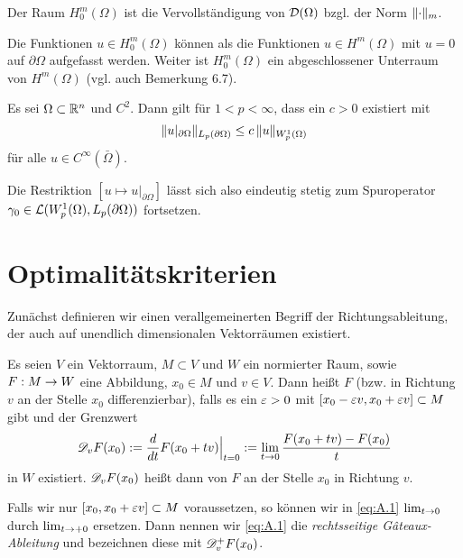 \begin{defi}\label{def:A.7}
Der Raum $H^m_0(\Omega)$ ist die Vervollständigung von $\mathcal D(\Omega)$ bzgl. der Norm $\lVert \cdot\rVert_m$.
\end{defi}

\begin{bem}\label{bem:A.8}
Die Funktionen $u \in H^m_0(\Omega)$ können als die Funktionen $u \in H^m(\Omega)$ mit $u = 0$ auf $\partial \Omega$ aufgefasst werden. Weiter ist $H^m_0(\Omega)$ ein abgeschlossener Unterraum von $H^m(\Omega)$ (vgl. auch \cite{Walker} Bemerkung 6.7).
\end{bem}


\begin{theorem}
  \label{theorem:A.9}
  Es sei $\Omega\subset\mathbb{R}^n$ und $C^2$. Dann gilt für $1<p<\infty$, dass ein $c>0$ existiert mit
  \[ \lVert u\rvert_{\partial\Omega}\rVert_{L_p(\partial\Omega)}\leq c\, \lVert u\rVert_{W_p^1(\Omega)} \]
  für alle $u\in C^\infty(\bar\Omega)$.

  Die Restriktion $[u\mapsto u\rvert_{\partial\Omega}]$ lässt sich also eindeutig stetig zum Spuroperator $\gamma_0\in\mathcal{L}(W_p^1(\Omega),L_p(\partial\Omega))$ fortsetzen.
\end{theorem}


\section{Optimalitätskriterien}
\label{anhang:A.2}

Zunächst definieren wir einen verallgemeinerten Begriff der Richtungsableitung, der auch auf unendlich dimensionalen Vektorräumen existiert.

\begin{defi}\label{def:Gateaux-Ableitung}
Es seien $V$ ein Vektorraum, $M\subset V$ und $W$ ein normierter Raum, sowie $F: M \rightarrow W$ eine Abbildung, $x_0 \in M$ und $v \in V$. Dann heißt $F$ \textit{} (bzw. in Richtung $v$ an der Stelle $x_0$ differenzierbar), falls es ein $\varepsilon >0$ mit $[x_0-\varepsilon v, x_0 + \varepsilon v] \subset M$ gibt und der Grenzwert
\begin{align}\label{eq:A.1}
	\mathscr D_v F (x_0) :=\frac d{d t} F(x_0+tv)\Big|_{t=0} := \lim_{t\rightarrow 0} \frac{F(x_0+tv)-F(x_0)}t
\end{align}
in $W$ existiert. $\mathscr D_vF(x_0)$ heißt dann \textit{} von $F$ an der Stelle $x_0$ in Richtung $v$.

Falls wir nur $[x_0,x_0 + \varepsilon v] \subset M$ voraussetzen, so können wir in \eqref{eq:A.1} $\lim_{t\rightarrow 0}$ durch $\lim_{t \rightarrow + 0}$ ersetzen. Dann nennen wir \eqref{eq:A.1} die \textit{rechtsseitige Gâteaux-Ableitung} und bezeichnen diese mit $\mathscr D^+_v F(x_0)$.
\end{defi}

